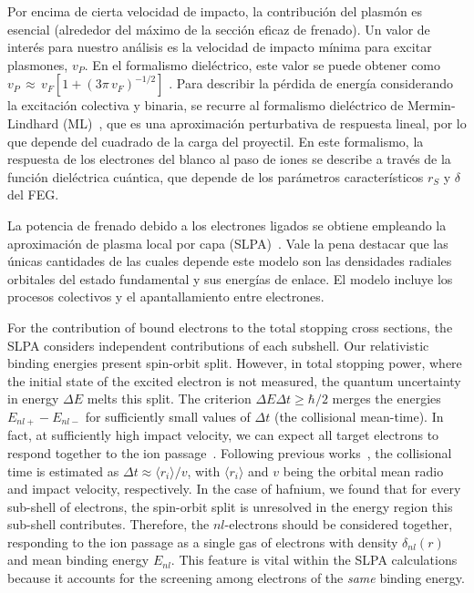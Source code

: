 Por encima de cierta velocidad de impacto, la contribución del plasmón 
es esencial (alrededor del máximo de la sección eficaz de frenado). Un 
valor de interés para nuestro análisis es la velocidad de impacto mínima 
para excitar plasmones, $v_P$. En el formalismo dieléctrico, este valor 
se puede obtener como $v_P\,\approx\,v_F[1+(3\pi\,v_F)^{-1/2}]$
\cite{suppression}. Para describir la pérdida de energía considerando la 
excitación colectiva y binaria, se recurre al formalismo dieléctrico de 
Mermin-Lindhard (ML)~\cite{Mermin}, que es una aproximación perturbativa
de respuesta lineal, por lo que depende del cuadrado de la carga del 
proyectil. En este formalismo, la respuesta de los electrones del blanco 
al paso de iones se describe a través de la función dieléctrica cuántica, 
que depende de los parámetros característicos $r_S$ y $\delta$ del FEG.

La potencia de frenado debido a los electrones ligados se obtiene 
empleando la aproximación de plasma local por capa 
(SLPA)~\cite{Montanari:17,Montanari:13}. Vale la pena destacar que las 
únicas cantidades de las cuales depende este modelo son las densidades 
radiales orbitales del estado fundamental y sus energías de enlace. El 
modelo incluye los procesos colectivos y el apantallamiento entre 
electrones. 


For the contribution of bound electrons to the total stopping cross 
sections, the SLPA considers independent contributions of each subshell. 
Our relativistic binding energies present spin-orbit split. However, 
in total stopping power, where the initial state of the excited electron 
is not measured, the quantum uncertainty in energy $\Delta E$ melts this 
split. The criterion $\Delta E\Delta t\geq\hbar/2$ merges the energies 
$E_{nl+}-E_{nl-}$ for sufficiently small values of $\Delta t$ (the 
collisional mean-time). In fact, at sufficiently high impact velocity, 
we can expect all target electrons to respond together to the ion 
passage~\cite{lindhard53,chu72}. Following previous works~\cite{mon09},
the collisional time is estimated as $\Delta t\approx\langle r_i\rangle/v$, 
with $\langle r_i\rangle$ and $v$ being the orbital mean radio and 
impact velocity, respectively. In the case of hafnium, we found that for 
every sub-shell of electrons, the spin-orbit split is unresolved in the 
energy region this sub-shell contributes. Therefore, the $nl$-electrons 
should be considered together, responding to the ion passage as a single 
gas of electrons with density $\delta_{nl}(r)$ and mean binding energy 
$E_{nl}$. This feature is vital within the SLPA calculations because 
it accounts for the screening among electrons of the \textit{same} 
binding energy. 

